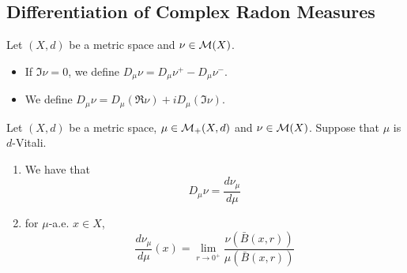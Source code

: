 \documentclass{book}
\begin{document}
	
	
	
	
	
	
	
	
	
	
	\subsection{Differentiation of Complex Radon Measures}
	
	\begin{defn} 
		Let $(X, d)$ be a metric space and $\nu \in \mathcal{M}(X)$.
		\begin{itemize}
			\item If $\Im \nu = 0$, we define $D_{\mu} \nu = D_{\mu} \nu^+ - D_{\mu} \nu^-$.
			\item We define $D_{\mu} \nu = D_{\mu} (\Re \nu) + i D_{\mu} (\Im \nu)$.
		\end{itemize}
	\end{defn}

	\begin{ex} 
		Let $(X, d)$ be a metric space, $\mu \in \mathcal{M}_+(X, d)$ and $\nu \in \mathcal{M}(X)$. Suppose that $\mu$ is $d$-Vitali.  
		\begin{enumerate}
			\item We have that 
			$$D_{\mu} \nu = \frac{d\nu_{\mu}}{d\mu}$$
			\item for $\mu$-a.e. $x \in X$, 
			$$\frac{d\nu_{\mu}}{d\mu}(x) = \lim_{r \rightarrow 0^+} \frac{ \nu(\bar{B}(x, r))}{\mu(\bar{B}(x, r))}$$
		\end{enumerate}
	\end{ex}
\end{document}
